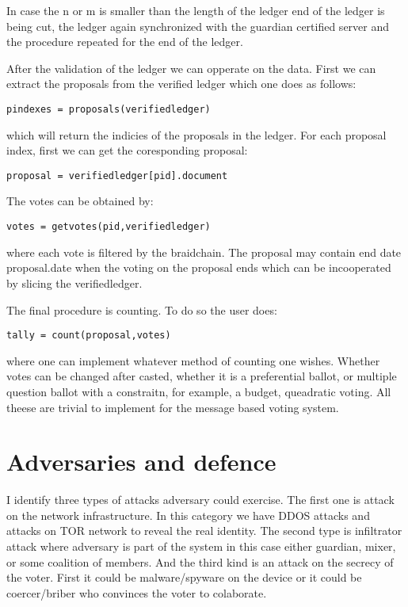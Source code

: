 \documentclass{article}
\begin{document}
In case the n or m is smaller than the length of the ledger end of the ledger is being cut, the ledger again synchronized with the guardian certified server and the procedure repeated for the end of the ledger.

After the validation of the ledger we can opperate on the data. First we can extract the proposals from the verified ledger which one does as follows:
\begin{lstlisting}
pindexes = proposals(verifiedledger)
\end{lstlisting}
which will return the indicies of the proposals in the ledger. For each proposal index, first we can get the coresponding proposal:
\begin{lstlisting}
proposal = verifiedledger[pid].document
\end{lstlisting}
The votes can be obtained by:
\begin{lstlisting}
votes = getvotes(pid,verifiedledger)
\end{lstlisting}
where each vote is filtered by the braidchain. The proposal may contain end date proposal.date when the voting on the proposal ends which can be incooperated by slicing the verifiedledger.

The final procedure is counting. To do so the user does:
\begin{lstlisting}
tally = count(proposal,votes)
\end{lstlisting}
where one can implement whatever method of counting one wishes. Whether votes can be changed after casted, whether it is a preferential ballot, or multiple question ballot with a constraitn, for example, a budget, queadratic voting. All theese are trivial to implement for the message based voting system.

\section{Adversaries and defence}

I identify three types of attacks adversary could exercise. The first one is attack on the network infrastructure. In this category we have DDOS attacks and attacks on TOR network to reveal the real identity. The second type is infiltrator attack where adversary is part of the system in this case either guardian, mixer, or some coalition of members. And the third kind is an attack on the secrecy of the voter. First it could be malware/spyware on the device or it could be coercer/briber who convinces the voter to colaborate.
\end{document}
